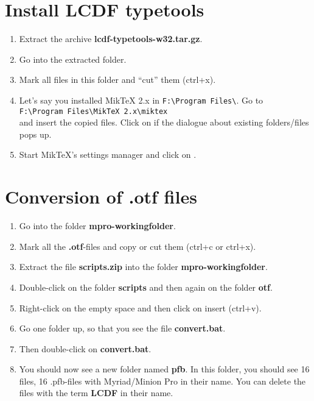 \section{Install LCDF typetools}

\begin{enumerate}
	\item Extract the archive \textbf{lcdf-typetools-w32.tar.gz}.
	\item Go into the extracted folder.
	\item Mark all files in this folder and ``cut'' them (ctrl+x).
	\item Let's say you installed MikTeX 2.x in \verb+F:\Program Files\+. Go to\\
	\verb+F:\Program Files\MikTeX 2.x\miktex+\\
	and insert the copied files. Click on  if the dialogue about existing folders/files pops up.
	\item Start MikTeX's settings manager and click on .
\end{enumerate}

\section{Conversion of .otf files}\label{sec:conversion}

\begin{enumerate}
	\item Go into the folder \textbf{mpro-workingfolder}.
	\item Mark all the \textbf{.otf}-files and copy or cut them (ctrl+c or ctrl+x).
	\item Extract the file \textbf{scripts.zip} into the folder \textbf{mpro-workingfolder}.
	\item Double-click on the folder \textbf{scripts} and then again on the folder \textbf{otf}.
	\item Right-click on the empty space and then click on insert (ctrl+v).
	\item Go one folder up, so that you see the file \textbf{convert.bat}.
	\item Then double-click on \textbf{convert.bat}.
	\item You should now see a new folder named \textbf{pfb}. In this folder, you should see 16 files, 16 .pfb-files with Myriad/Minion Pro in their name. You can delete the files with the term \textbf{LCDF} in their name.
\end{enumerate}

